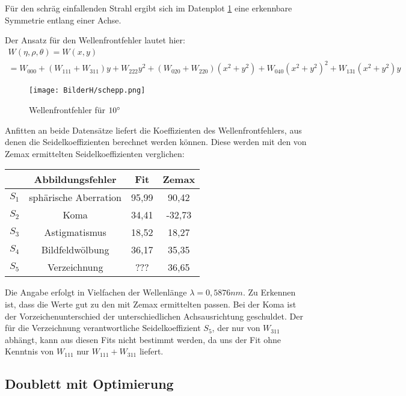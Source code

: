 \documentclass[twoside,colorback,accentcolor=tud4c,11pt]{tudreport}
\begin{document}
Für den schräg einfallenden Strahl ergibt sich im Datenplot \ref{fig:WFF2} eine erkennbare Symmetrie entlang einer Achse.

Der Ansatz für den Wellenfrontfehler lautet hier:
\begin{multline}
	W(\eta,\rho,\theta)=W(x,y)\\
	=W_{000}+(W_{111}+W_{311})y+W_{222}y^2+(W_{020}+W_{220})\left(x^2+y^2\right)+W_{040}\left(x^2+y^2\right)^2+W_{131}\left(x^2+y^2\right)y
\end{multline}

\begin{figure}[H]
\centering
   	\begin{minipage}[b]{\textwidth}
   	\centering
	\texttt{[image: BilderH/schepp.png]}
   	\caption{Wellenfrontfehler für $10\degree$}\label{fig:WFF2} 
  	\end{minipage}  	
   	
\end{figure}

Anfitten an beide Datensätze liefert die Koeffizienten des Wellenfrontfehlers, aus denen die Seidelkoeffizienten berechnet werden können. Diese werden mit den von Zemax ermittelten Seidelkoeffizienten verglichen:

\begin{table}[H]
\centering
\begin{tabular}{|c|c|c|c|}
\hline 
 & Abbildungsfehler & Fit & Zemax \\ 
\hline 
$S_1$ & sphärische Aberration & 95,99 & 90,42 \\ 
$S_2$ & Koma & 34,41 & -32,73 \\ 
$S_3$ & Astigmatismus & 18,52 & 18,27 \\ 
$S_4$ & Bildfeldwölbung & 36,17 & 35,35\\  
$S_5$ & Verzeichnung & ??? & 36,65\\
\hline 
\end{tabular} 
\end{table}

Die Angabe erfolgt in Vielfachen der Wellenlänge $\lambda = 0,5876 nm$. Zu Erkennen ist, dass die Werte gut zu den mit Zemax ermittelten passen. Bei der Koma ist der Vorzeichenunterschied der unterschiedlichen Achsausrichtung geschuldet. Der für die Verzeichnung verantwortliche Seidelkoeffizient $S_5$, der nur von $W_{311}$ abhängt, kann aus diesen Fits nicht bestimmt werden, da uns der Fit ohne Kenntnis von $W_{111}$ nur $W_{111} + W_{311}$ liefert. 
	\subsection{Doublett mit Optimierung}
	
\end{document}

